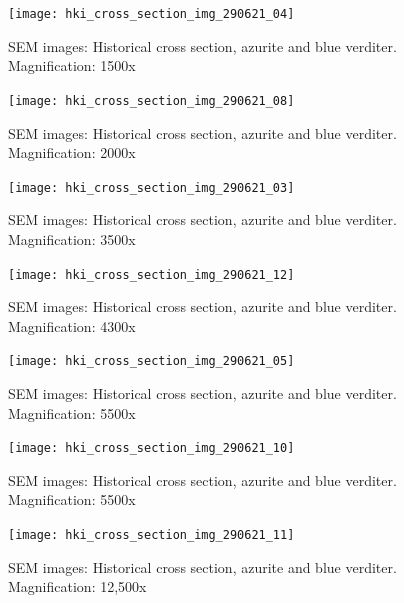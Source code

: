 \begin{figure}[H]
\centering
  \texttt{[image: hki\_cross\_section\_img\_290621\_04]}
\caption[SEM images: Historical cross section, azurite and blue verditer]{SEM images: Historical cross section, azurite and blue verditer. Magnification: 1500x}
\label{fig:xsection_dept_2}
\end{figure}

\begin{figure}[H]
\centering
  \texttt{[image: hki\_cross\_section\_img\_290621\_08]}
\caption[SEM images: Historical cross section, azurite and blue verditer]{SEM images: Historical cross section, azurite and blue verditer. Magnification: 2000x}
\label{fig:xsection_dept_3}
\end{figure}

\begin{figure}[H]
\centering
  \texttt{[image: hki\_cross\_section\_img\_290621\_03]}
\caption[SEM images: Historical cross section, azurite and blue verditer]{SEM images: Historical cross section, azurite and blue verditer. Magnification: 3500x}
\label{fig:xsection_dept_4}
\end{figure}

\begin{figure}[H]
\centering
  \texttt{[image: hki\_cross\_section\_img\_290621\_12]}
\caption[SEM images: Historical cross section, azurite and blue verditer]{SEM images: Historical cross section, azurite and blue verditer. Magnification: 4300x}
\label{fig:xsection_dept_5}
\end{figure}

\begin{figure}[H]
\centering
  \texttt{[image: hki\_cross\_section\_img\_290621\_05]}
\caption[SEM images: Historical cross section, azurite and blue verditer]{SEM images: Historical cross section, azurite and blue verditer. Magnification: 5500x}
\label{fig:xsection_dept_6}
\end{figure}

\begin{figure}[H]
\centering
  \texttt{[image: hki\_cross\_section\_img\_290621\_10]}
\caption[SEM images: Historical cross section, azurite and blue verditer]{SEM images: Historical cross section, azurite and blue verditer. Magnification: 5500x}
\label{fig:xsection_dept_7}
\end{figure}

\begin{figure}[H]
\centering
  \texttt{[image: hki\_cross\_section\_img\_290621\_11]}
\caption[SEM images: Historical cross section, azurite and blue verditer]{SEM images: Historical cross section, azurite and blue verditer. Magnification: 12,500x}
\label{fig:xsection_dept_8}
\end{figure}

